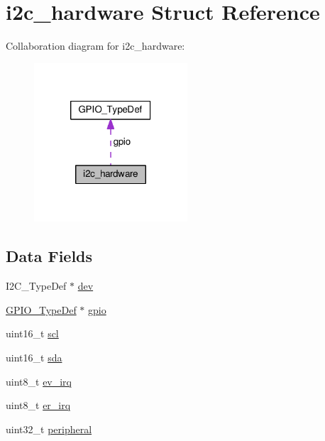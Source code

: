 \hypertarget{structi2c__hardware}{\section{i2c\+\_\+hardware Struct Reference}
\label{structi2c__hardware}
}


Collaboration diagram for i2c\+\_\+hardware\+:\nopagebreak
\begin{figure}[H]
\begin{center}
\leavevmode
\includegraphics[width=162pt]{structi2c__hardware__coll__graph}
\end{center}
\end{figure}
\subsection*{Data Fields}
\begin{DoxyCompactItemize}
\item 
I2\+C\+\_\+\+Type\+Def $\ast$ \hyperlink{structi2c__hardware_afdf79636db539b889c9c0a28b787d569}{dev}
\item 
\hyperlink{structGPIO__TypeDef}{G\+P\+I\+O\+\_\+\+Type\+Def} $\ast$ \hyperlink{structi2c__hardware_a6a852611ce5f7400d9f15764d5ceea12}{gpio}
\item 
uint16\+\_\+t \hyperlink{structi2c__hardware_ab5151d8d69e0ee681feae1f8159849e1}{scl}
\item 
uint16\+\_\+t \hyperlink{structi2c__hardware_aedf614b92fd17411f6e62fd24e0bd3a1}{sda}
\item 
uint8\+\_\+t \hyperlink{structi2c__hardware_a518fa0bd2d62bcaea89521ecb1abc866}{ev\+\_\+irq}
\item 
uint8\+\_\+t \hyperlink{structi2c__hardware_acc6003ffec72ac538d2250ad7dbcc53b}{er\+\_\+irq}
\item 
uint32\+\_\+t \hyperlink{structi2c__hardware_aecd3b2f9743d115b203b0bca7d6b5f57}{peripheral}
\end{DoxyCompactItemize}


